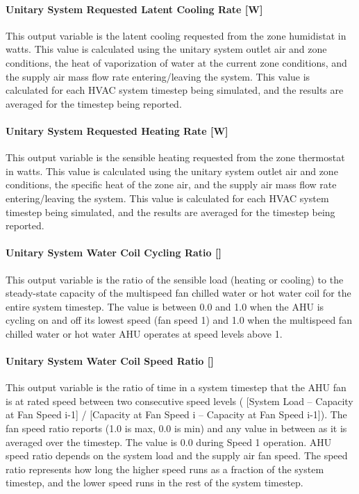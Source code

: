 \paragraph{Unitary System Requested Latent Cooling Rate {[}W{]}}\label{unitary-system-requested-latent-cooling-rate-w}

This output variable is the latent cooling requested from the zone humidistat in watts. This value is calculated using the unitary system outlet air and zone conditions, the heat of vaporization of water at the current zone conditions, and the supply air mass flow rate entering/leaving the system. This value is calculated for each HVAC system timestep being simulated, and the results are averaged for the timestep being reported.

\paragraph{Unitary System Requested Heating Rate {[}W{]}}\label{unitary-system-requested-heating-rate-w}

This output variable is the sensible heating requested from the zone thermostat in watts. This value is calculated using the unitary system outlet air and zone conditions, the specific heat of the zone air, and the supply air mass flow rate entering/leaving the system. This value is calculated for each HVAC system timestep being simulated, and the results are averaged for the timestep being reported.

\paragraph{Unitary System Water Coil Cycling Ratio {[]}}\label{unitary-system-water-coil-cycling-ratio}

This output variable is the ratio of the sensible load (heating or cooling) to the steady-state capacity of the multispeed fan chilled water or hot water coil for the entire system timestep. The value is between 0.0 and 1.0 when the AHU is cycling on and off its lowest speed (fan speed 1) and 1.0 when the multispeed fan chilled water or hot water AHU operates at speed levels above 1.

\paragraph{Unitary System Water Coil Speed Ratio {[]}}\label{unitary-system-water-coil-speed-ratio}

This output variable is the ratio of time in a system timestep that the AHU fan is at rated speed between two consecutive speed levels ( {[}System Load -- Capacity at Fan Speed i-1{]} / {[}Capacity at Fan Speed i -- Capacity at Fan Speed i-1{]}). The fan speed ratio reports (1.0 is max, 0.0 is min) and any value in between as it is averaged over the timestep. The value is 0.0 during Speed 1 operation. AHU speed ratio depends on the system load and the supply air fan speed. The speed ratio represents how long the higher speed runs as a fraction of the system timestep, and the lower speed runs in the rest of the system timestep.

